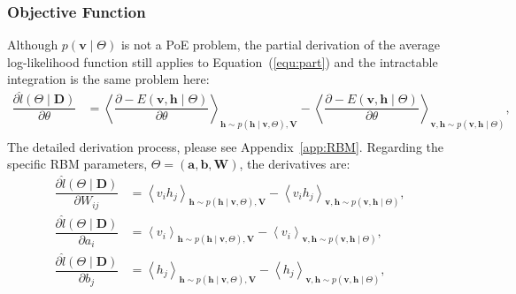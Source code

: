 \subsubsection{Objective Function}
	Although $ p(\mathbf{v} \mid \Theta) $ is not a PoE problem, the partial derivation of the average log-likelihood function still applies to Equation~(\ref{equ:part}) and the intractable integration is the same problem here:
	\begin{equation}
		\label{equ:RBM}
		\begin{aligned}
		\dfrac{\partial \hat{l} (\Theta \mid \mathbf{D})}{\partial \theta} 
		& = \left \langle \dfrac{\partial -E(\mathbf{v}, \mathbf{h} \mid \Theta)}{\partial \theta} \right \rangle_{\mathbf{h} \sim p( \mathbf{h} \mid \mathbf{v}, \Theta), \mathbf{V}} 
		- \left \langle \dfrac{\partial -E(\mathbf{v}, \mathbf{h} \mid \Theta)}{\partial \theta} \right \rangle_{\mathbf{v}, \mathbf{h} \sim p( \mathbf{v}, \mathbf{h} \mid  \Theta)},  \\
		\end{aligned}
	\end{equation}
	The detailed derivation process, please see Appendix~\ref{app:RBM}.
	Regarding the specific RBM parameters,  $ \Theta = (\mathbf{a}, \mathbf{b}, \mathbf{W}) $, the derivatives are:
	\begin{equation}
		\label{equ:RBM_2}
		\begin{aligned}
		\dfrac{\partial \hat{l} (\Theta \mid \mathbf{D})}{\partial W_{ij}} 
		& = \left \langle v_i h_j \right \rangle_{\mathbf{h} \sim p( \mathbf{h} \mid \mathbf{v}, \Theta), \mathbf{V}} 
		- \left \langle  v_i h_j \right \rangle_{\mathbf{v}, \mathbf{h} \sim p( \mathbf{v}, \mathbf{h} \mid  \Theta)},  \\
		\dfrac{\partial \hat{l} (\Theta \mid \mathbf{D})}{\partial a_{i}} 
		& = \left \langle v_i \right \rangle_{\mathbf{h} \sim p( \mathbf{h} \mid \mathbf{v}, \Theta), \mathbf{V}} 
		- \left \langle  v_i \right \rangle_{\mathbf{v}, \mathbf{h} \sim p( \mathbf{v}, \mathbf{h} \mid  \Theta)},  \\
		\dfrac{\partial \hat{l} (\Theta \mid \mathbf{D})}{\partial b_{j}} 
		& = \left \langle h_j \right \rangle_{\mathbf{h} \sim p( \mathbf{h} \mid \mathbf{v}, \Theta), \mathbf{V}} 
		- \left \langle  h_j \right \rangle_{\mathbf{v}, \mathbf{h} \sim p( \mathbf{v}, \mathbf{h} \mid  \Theta)},  \\
	\end{aligned}
	\end{equation}	 
	
